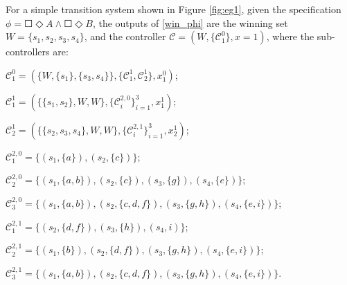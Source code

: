 \begin{example}
\label{ex:exec}
	For a simple transition system shown in Figure \ref{fig:eg1}, given the specification $ \phi = \Square \Diamond A \wedge \Square \Diamond B $, the outputs of \eqref{win_phi} are the winning set $ W= \{s_1,s_2,s_3,s_4\}$, and the controller $ \mathcal{C} = (W,\{\mathcal{C}^0_1\}, x = 1) $, where the sub-controllers are:
	
	$ \mathcal{C}^0_1 = (\{W,\{s_1\},\{s_3,s_4\}\},\{\mathcal{C}^1_1, \mathcal{C}^1_2\}, x^0_1 ) $; 
	
	$ \mathcal{C}^1_1 = (\{\{s_1,s_2\},W,W \},\{\mathcal{C}^{2,0}_i\}_{i=1}^3,x^1_1)$;
	
	$ \mathcal{C}^1_2 = (\{\{s_2,s_3,s_4\},W,W \},\{\mathcal{C}^{2,1}_i\}_{i=1}^{3},x^1_2 )$;
    
    $ \mathcal{C}^{2,0}_1 = \{(s_1,\{a\}),(s_2,\{c\})\} $;
	
	$ \mathcal{C}^{2,0}_2 = \{(s_1,\{a,b\}),(s_2,\{c\}),(s_3,\{g\}),(s_4,\{e\})\} $;
	
	$ \mathcal{C}^{2,0}_3 = \{(s_1,\{a,b\}),(s_2,\{c,d,f\}),(s_3,\{g,h\}),(s_4,\{e,i\})\} $; 
	
	$ \mathcal{C}^{2,1}_1 = \{(s_2,\{d,f\}),(s_3,\{h\}),(s_4,i)\} $; 
	
	$ \mathcal{C}^{2,1}_2 = \{(s_1,\{b\}),(s_2,\{d,f\}), (s_3,\{g,h\}), (s_4,\{e,i\})\} $;
	
	$ \mathcal{C}^{2,1}_3 = \{(s_1,\{a,b\}),(s_2,\{c,d,f\}),(s_3,\{g,h\}),(s_4,\{e,i\})\} $.
	

\end{example}
